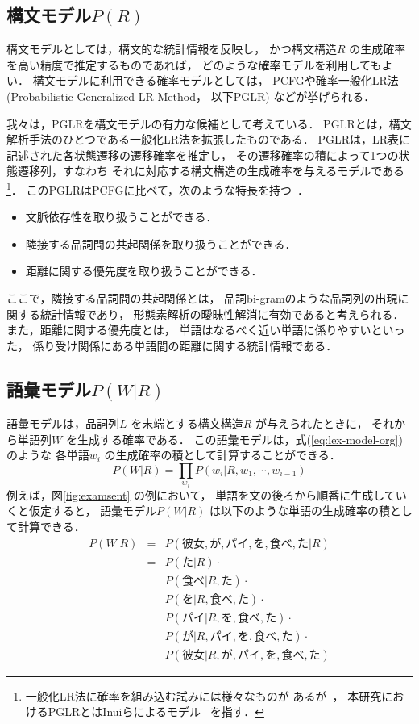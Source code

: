 \subsection{構文モデル$P(R)$}
\label{sec:syn-model}

構文モデルとしては，構文的な統計情報を反映し，
かつ構文構造$R$ の生成確率を高い精度で推定するものであれば，
どのような確率モデルを利用してもよい．
構文モデルに利用できる確率モデルとしては，
PCFGや確率一般化LR法(Probabilistic Generalized LR Method，
以下PGLR)
などが挙げられる．

我々は，PGLRを構文モデルの有力な候補として考えている．
PGLRとは，構文解析手法のひとつである一般化LR法を拡張したものである．
PGLRは，LR表に記述された各状態遷移の遷移確率を推定し，
その遷移確率の積によって1つの状態遷移列，すなわち
それに対応する構文構造の生成確率を与えるモデルである\footnote{
  一般化LR法に確率を組み込む試みには様々なものが
  あるが~\cite{wright:90:a,ng:91:a,briscoe:93:a}，
  本研究におけるPGLRとはInuiらによるモデル~\cite{inui:97:d,virach:97:c}
  を指す．
  }．
このPGLRはPCFGに比べて，次のような特長を持つ~\cite{inui:97:d}．

\begin{itemize}
\item 文脈依存性を取り扱うことができる．
\item 隣接する品詞間の共起関係を取り扱うことができる．
\item 距離に関する優先度を取り扱うことができる．
\end{itemize}
ここで，隣接する品詞間の共起関係とは，
品詞bi-gramのような品詞列の出現に関する統計情報であり，
形態素解析の曖昧性解消に有効であると考えられる．
また，距離に関する優先度とは，
単語はなるべく近い単語に係りやすいといった，
係り受け関係にある単語間の距離に関する統計情報である．
\subsection{語彙モデル$P(W|R)$}
\label{sec:lex-model}

語彙モデルは，品詞列$L$ を末端とする構文構造$R$ が与えられたときに，
それから単語列$W$ を生成する確率である．
この語彙モデルは，式(\ref{eq:lex-model-org})のような
各単語$w_i$ の生成確率の積として計算することができる．
\begin{equation}
  \label{eq:lex-model-org}
  P(W|R) = \prod_{w_i} P(w_i | R,w_1,\cdots,w_{i-1})
\end{equation}
例えば，図\ref{fig:examsent} の例において，
単語を文の後ろから順番に生成していくと仮定すると，
語彙モデル$P(W|R)$ は以下のような単語の生成確率の積として計算できる．
\begin{eqnarray}
  P(W|R) &=& P(彼女,が,パイ,を,食べ,た|R) \\
  \label{eq:der1-ta}
  &=& P(た|R) \cdot \\
  \label{eq:der1-tabe}
  && P(食べ|R,た) \cdot \\
  \label{eq:der1-o}
  && P(を|R,食べ,た) \cdot \\
  \label{eq:der1-pai}
  && P(パイ|R,を,食べ,た) \cdot \\
  \label{eq:der1-ga}
  && P(が|R,パイ,を,食べ,た) \cdot \\
  \label{eq:der1-kanojo}
  && P(彼女|R,が,パイ,を,食べ,た)
\end{eqnarray}
